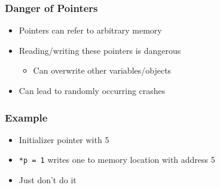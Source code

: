 \begin{frame}
  \frametitle{Danger of Pointers}
  \begin{itemize}
    \item Pointers can refer to arbitrary memory
    \item Reading/writing these pointers is dangerous
          \begin{itemize}
            \item Can overwrite other variables/objects
          \end{itemize}
    \item Can lead to randomly occurring crashes
  \end{itemize}
\end{frame}

\begin{frame}
  \frametitle{Example}
  \begin{itemize}
    \item Initializer pointer with 5
    \item \texttt{*p = 1} writes one to memory location with address 5
    \item Just don't do it
  \end{itemize}
\end{frame}

